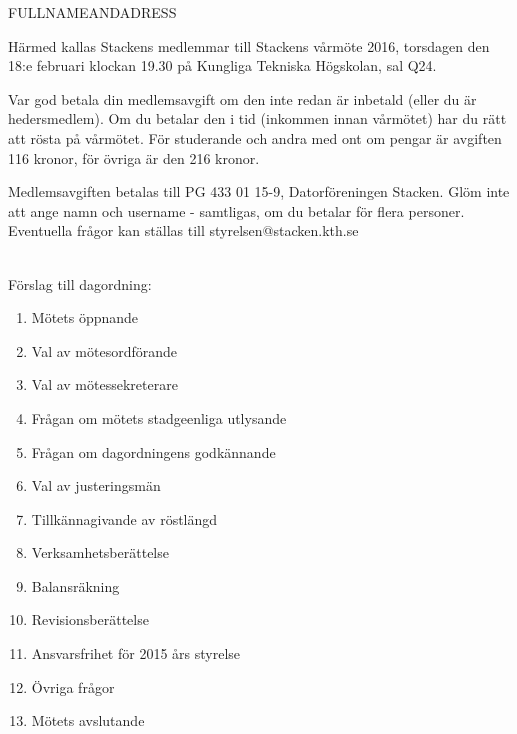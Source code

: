 \documentclass[fontsize=11pt,enlargefirstpage,firstfoot=false,a4paper,pagenumber=no]{scrlttr2}
\begin{document}
 
\begin{letter}{FULLNAMEANDADRESS}

\opening{Härmed kallas Stackens medlemmar till Stackens vårmöte 2016, torsdagen den 18:e februari klockan 19.30 på Kungliga Tekniska Högskolan, sal Q24.}

Var god betala din medlemsavgift om den inte redan är inbetald (eller du är hedersmedlem). Om du betalar den i tid (inkommen innan vårmötet) har du rätt att rösta på vårmötet. För studerande och andra med ont om pengar är avgiften 116 kronor, för övriga är den 216 kronor.

Medlemsavgiften betalas till PG 433 01 15-9, Datorföreningen Stacken. Glöm inte att ange namn och username - samtligas, om du betalar för flera personer. Eventuella frågor kan ställas till styrelsen@stacken.kth.se

~\\
Förslag till dagordning:

\begin{multicols}{2}
\begin{enumerate}
	\itemsep0em
	\item  Mötets öppnande
	\item  Val av mötesordförande
	\item  Val av mötessekreterare
	\item  Frågan om mötets stadgeenliga utlysande
	\item  Frågan om dagordningens godkännande
	\item  Val av justeringsmän
	\item  Tillkännagivande av röstlängd
	\item  Verksamhetsberättelse
	\item  Balansräkning
	\item  Revisionsberättelse
	\item  Ansvarsfrihet för 2015 års styrelse
	\item  Övriga frågor
	\item  Mötets avslutande
\end{enumerate}
\end{multicols}

\closing{}
\enlargethispage{3\baselineskip}

\end{letter}
\end{document}
